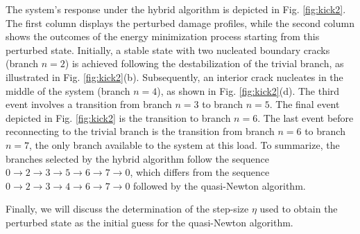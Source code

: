 The system's response under the hybrid algorithm is depicted in Fig. \ref{fig:kick2}. The first column displays the perturbed damage profiles, while the second column shows the outcomes of the energy minimization process starting from  this perturbed state. Initially, a stable state with two nucleated boundary cracks (branch \( n=2 \)) is achieved following the destabilization of the trivial branch, as illustrated in Fig. \ref{fig:kick2}(b). Subsequently, an interior crack nucleates in the middle of the system (branch \( n=4 \)), as shown in Fig. \ref{fig:kick2}(d). The third event involves a transition from branch \( n=3 \) to branch \( n=5 \). The final event depicted in Fig. \ref{fig:kick2} is the transition to branch \( n=6 \). The last event before reconnecting to the trivial branch is the transition from branch \( n=6 \) to branch \( n=7 \), the only  branch available to the system at this load. To summarize, the branches selected by the hybrid algorithm follow the sequence 
\( 0 \rightarrow 2 \rightarrow 3 \rightarrow 5 \rightarrow 6 \rightarrow 7 \rightarrow 0 \), 
which differs from the sequence 
\( 0 \rightarrow 2 \rightarrow 3 \rightarrow 4 \rightarrow 6 \rightarrow 7 \rightarrow 0 \) 
followed by the quasi-Newton algorithm.

Finally, we will discuss the determination of the step-size \( \eta \) used to obtain the perturbed state as the initial guess for the quasi-Newton algorithm.

